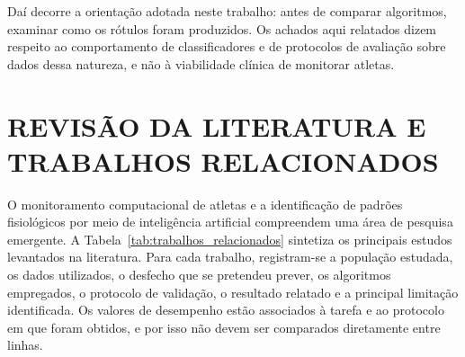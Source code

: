 Daí decorre a orientação adotada neste trabalho: antes de comparar algoritmos, examinar como os rótulos foram produzidos. Os achados aqui relatados dizem respeito ao comportamento de classificadores e de protocolos de avaliação sobre dados dessa natureza, e não à viabilidade clínica de monitorar atletas.

\chapter{REVISÃO DA LITERATURA E TRABALHOS RELACIONADOS}

O monitoramento computacional de atletas e a identificação de padrões fisiológicos por meio de inteligência artificial compreendem uma área de pesquisa emergente. A Tabela~\ref{tab:trabalhos_relacionados} sintetiza os principais estudos levantados na literatura. Para cada trabalho, registram-se a população estudada, os dados utilizados, o desfecho que se pretendeu prever, os algoritmos empregados, o protocolo de validação, o resultado relatado e a principal limitação identificada. Os valores de desempenho estão associados à tarefa e ao protocolo em que foram obtidos, e por isso não devem ser comparados diretamente entre linhas.

